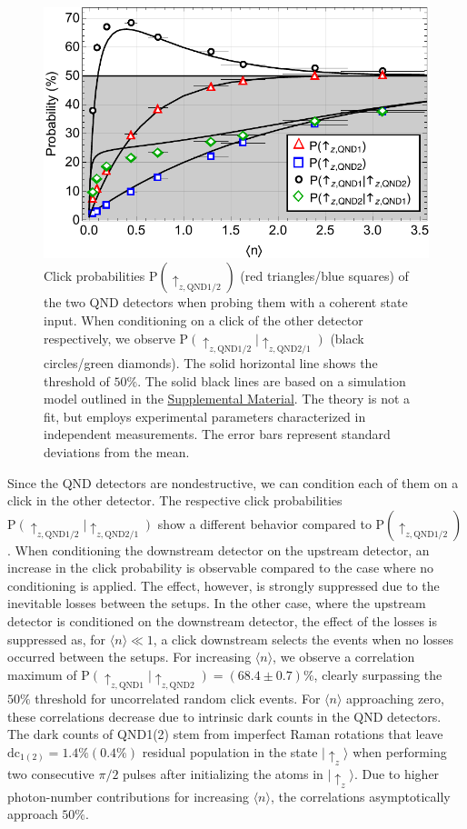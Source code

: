 \documentclass[prl,amsmath,amssymb,bibnotes,aps,longbibliography,12pt]{revtex4-1}
\newcommand{\ket}[1]{|{#1}\rangle}
\newcommand{\braket}[1]{\langle{#1}\rangle}
\begin{document}
\begin{figure}[t]
\centering
\includegraphics[width=\columnwidth]{Fig2.pdf}
\caption{\label{fig:correlations} Click probabilities $\text{P}(\uparrow_{z,\text{QND1/2}})$ (red triangles/blue squares) of the two QND detectors when probing them with a coherent state input. When conditioning on a click of the other detector respectively, we observe $\text{P}(\uparrow_{z,\text{QND1/2}}\vert\uparrow_{z,\text{QND2/1}})$ (black circles/green diamonds). The solid horizontal line shows the threshold of $50\%$. The solid black lines are based on a simulation model outlined in the \hyperref[supplement]{Supplemental Material}. The theory is not a fit, but employs experimental parameters characterized in independent measurements. The error bars represent standard deviations from the mean. }
\end{figure}
Since the QND detectors are nondestructive, we can condition each of them on a click in the other detector. The respective click probabilities $\text{P}(\uparrow_{z,\text{QND1/2}}\vert\uparrow_{z,\text{QND2/1}})$ show a different behavior compared to $\text{P}(\uparrow_{z,\text{QND1/2}})$. When conditioning the downstream detector on the upstream detector, an increase in the click probability is observable compared to the case where no conditioning is applied. The effect, however, is strongly suppressed due to the inevitable losses between the setups. In the other case, where the upstream detector is conditioned on the downstream detector, the effect of the losses is suppressed as, for $\braket{n} \ll 1$, a click downstream selects the events when no losses occurred between the setups. For increasing $\braket{n}$, we observe a correlation maximum of $\text{P}(\uparrow_{z, \text{QND1}}\vert \uparrow_{z, \text{QND2}})=(68.4\pm0.7)\%$, clearly surpassing the $50\%$ threshold for uncorrelated random click events. For $\braket{n}$ approaching zero, these correlations decrease due to intrinsic dark counts in the QND detectors. The dark counts of QND1(2) stem from imperfect Raman rotations that leave $\text{dc}_{1(2)}=1.4\%(0.4\%)$ residual population in the state $\ket{\uparrow_z}$ when performing two consecutive $\pi/2$ pulses after initializing the atoms in $\ket{\uparrow_z}$. Due to higher photon-number contributions for increasing $\braket{n}$, the correlations asymptotically approach $50\%$.
\end{document}
